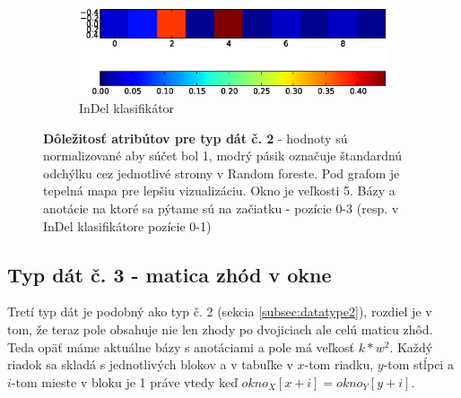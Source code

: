 \begin{figure}[htp]
\begin{subfigure}[t]{0.4\textwidth}
                \includegraphics[width=\textwidth]{images/clf_fi/randomforest_cmp_5_indel_heatmap}
                \caption{InDel klasifikátor}
                \label{fig:datatype2-i}
        \end{subfigure}
        \caption[Dôležitosť atribútov pre typ dát č. 2]{
        \textbf{Dôležitosť atribútov pre typ dát č. 2} - hodnoty sú normalizované aby súčet bol 1, modrý pásik označuje štandardnú odchýlku cez jednotlivé stromy v Random foreste.
        Pod grafom je tepelná mapa pre lepšiu vizualizáciu. Okno je veľkosti 5. Bázy a anotácie na ktoré sa pýtame sú na začiatku - pozície 0-3 (resp. v InDel klasifikátore pozície 0-1)
        }
        \label{fig:datatype2}

\end{figure}


\subsection{Typ dát č. 3 - matica zhód v okne}

Tretí typ dát je podobný ako typ č. 2 (sekcia \ref{subsec:datatype2}), rozdiel je v tom, že teraz pole obsahuje nie len zhody po dvojiciach ale celú maticu zhôd. Teda opäť máme aktuálne bázy s anotáciami a pole má veľkosť $k*w^2$. Každý riadok sa skladá s jednotlivých blokov a v tabuľke v $x$-tom riadku, $y$-tom stĺpci a $i$-tom mieste v bloku je 1 práve
vtedy keď $okno_X[x+i] = okno_Y[y+i]$.

